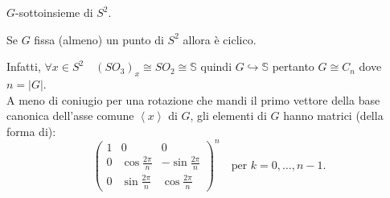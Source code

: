 $G$-sottoinsieme di $S^2$.
\begin{oss}
Se $G$ fissa (almeno) un punto di $S^2$ allora \`e ciclico.
\end{oss}
Infatti, $\forall x \in S^2\quad (SO_3)_x\cong SO_2\cong\mathbb{S}$ quindi $G\hookrightarrow\mathbb{S}$ pertanto $G\cong C_n$ dove
$n=\left|G\right|$.\\
A meno di coniugio per una rotazione che mandi il primo vettore della base canonica dell'asse comune $\left<x\right>$ di $G$, gli elementi
di $G$ hanno matrici (della forma di):
\begin{equation*}
\left(\begin{array}{ccc}
1 & 0 & 0\\
0 & \cos{\frac{2\pi}{n}} & -\sin{\frac{2\pi}{n}}\\
0 & \sin{\frac{2\pi}{n}} & \cos{\frac{2\pi}{n}}
\end{array}\right)^n\quad \text{per } k=0,\dots,n-1.
\end{equation*}

